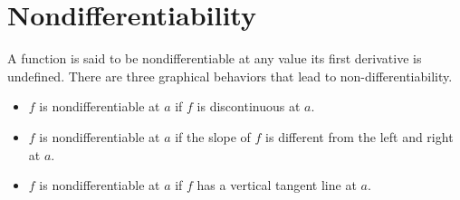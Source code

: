 \documentclass[10pt,oneside,]{book}
\theoremstyle{plain}
\theoremstyle{definition}
\numberwithin{equation}{section}
\begin{document}
\section[Nondifferentiability]{Nondifferentiability}\label{section-nondifferentiability}
A function is said to be nondifferentiable at any value its first derivative is undefined.  There are three graphical behaviors that lead to non-differentiability.%
\begin{itemize}[label=\textbullet]
\item{}\(f\) is nondifferentiable at \(a\) if \(f\) is discontinuous at \(a\).\item{}\(f\) is nondifferentiable at \(a\) if the slope of \(f\) is different from the left and right at \(a\).\item{}\(f\) is nondifferentiable at \(a\) if \(f\) has a vertical tangent line at \(a\).\end{itemize}
\typeout{************************************************}
\typeout{************************************************}
\end{document}
